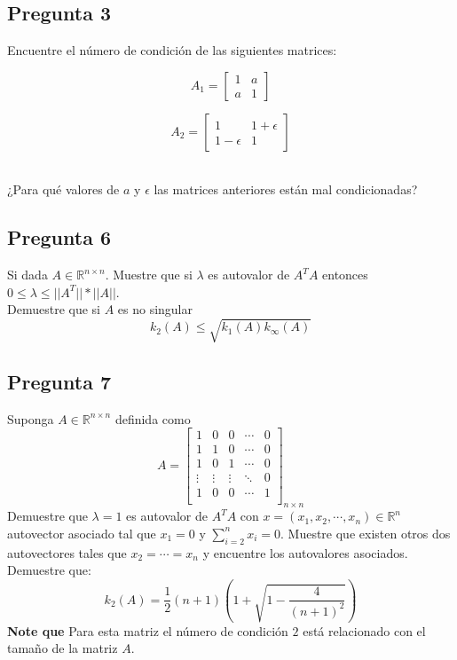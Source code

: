 \documentclass{article}
\def\R{\mbox{\(\mathbb{R}\)}}
\begin{document}
\subsection*{Pregunta 3}
Encuentre el número de condición de las siguientes matrices:\\
\begin{figure}[h!]
\begin{minipage}{4cm}
\center
$$
A_1 =  
\begin{bmatrix}
1 & a\\
a & 1
\end{bmatrix}$$
\end{minipage}
\begin{minipage}{4cm}
$$A_2 =
\begin{bmatrix}
1 & 1 + \epsilon\\
1 - \epsilon & 1
\end{bmatrix}$$
\end{minipage}
\end{figure}
\\
¿Para qué valores de $a$ y $\epsilon$ las matrices anteriores están mal condicionadas?
\subsection*{Pregunta 6}
Si dada $A \in \mathbb{R}^{n\times n}$. Muestre que si $\lambda$ es autovalor de $A^{T}A$ entonces $0\leq \lambda\leq ||A^{T}||* ||A||$.\\
Demuestre que si $A$ es no singular
$$k_2(A) \leq \sqrt{k_1(A)k_\infty(A)} $$
\subsection*{Pregunta 7}
Suponga $A \in \mathbb{R}^{n\times n}$ definida como
$$A =
\begin{bmatrix}
1&0&0&\cdots &0\\
1&1&0&\cdots &0\\
1&0&1&\cdots &0\\
\vdots&\vdots&\vdots&\ddots& 0\\
1&0&0&\cdots &1\\
\end{bmatrix}_{n\times n}
$$
Demuestre que $\lambda =1$ es autovalor de $A^{T}A$ con $x = (x_1, x_2, \cdots, x_n)\in \R^n$ autovector asociado tal que $x_1 = 0$ y $\sum_{i=2}^{n}x_i = 0$. Muestre que existen otros dos autovectores tales que $x_2 = \cdots = x_n$ y encuentre los autovalores asociados. Demuestre que:
$$ k_2(A) = \frac{1}{2}(n+1)\left(1+\sqrt{1-\frac{4}{(n+1)^{2}}}\right)$$
{\bf Note que} Para esta matriz el número de condición $2$ está relacionado con el tamaño de la matriz $A$.
\end{document}
